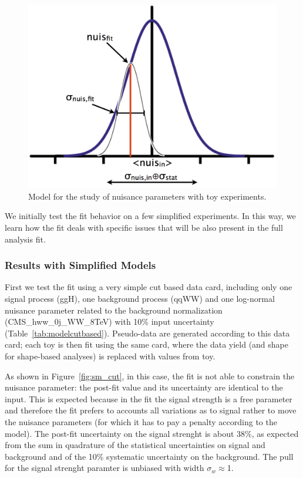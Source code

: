 \begin{figure}[!hbtp]
\centering
\includegraphics[width=.45\textwidth]{figures/nuismodel.png}
\caption{Model for the study of nuisance parameters with toy experiments.}
\label{fig:nuismodel}
\end{figure}

We initially test the fit behavior on a few simplified experiments. 
In this way, we learn how the fit deals with specific issues that will be also present in the full analysis fit.

\subsubsection{Results with Simplified Models}

First we test the fit using a very simple cut based data card, 
including only one signal process (ggH), one background process (qqWW) and one log-normal nuisance parameter 
related to the background normalization (CMS\_hww\_0j\_WW\_8TeV) with 10\% input uncertainty  (Table~\ref{tab:modelcutbased}).
Pseudo-data are generated according to this data card; each toy is then fit using the same card, where the data 
yield (and shape for shape-based analyses) is replaced with values from toy.

As shown in Figure~\ref{fig:sm_cut}, in this case, the fit is not able to constrain the nuisance parameter: 
the post-fit value and its uncertainty are identical to the input. 
This is expected because in the fit the signal strength is a free parameter and therefore the 
fit prefers to accounts all variations as to signal rather to move the nuisance parameters 
(for which it has to pay a penalty according to the model). 
The post-fit uncertainty on the signal strenght is about 38\%, as expected from the sum in quadrature of the statistical 
uncertainties on signal and background and of the 10\% systematic uncertainty on the background.
The pull for the signal strenght paramter is unbiased with width $\sigma_{w}$$\approx$1. 

